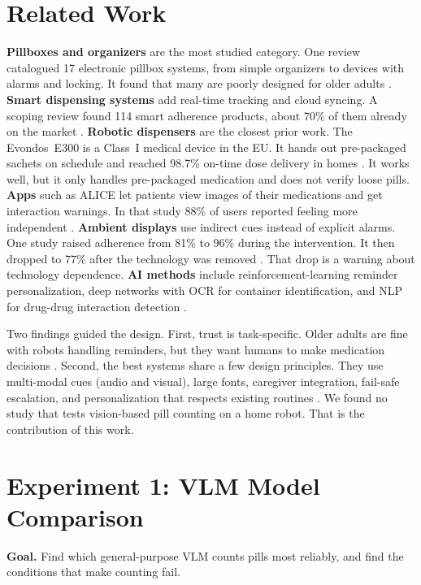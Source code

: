 \documentclass[10pt,twocolumn]{article}
\begin{document}
\section{Related Work}\label{sec:related}
\textbf{Pillboxes and organizers} are the most studied category. One review
catalogued 17 electronic pillbox systems, from simple organizers to devices with
alarms and locking. It found that many are poorly designed for older adults
\cite{miguel2018}. \textbf{Smart dispensing systems} add real-time tracking and
cloud syncing. A scoping review found 114 smart adherence products, about 70\% of
them already on the market \cite{faisal2023}. \textbf{Robotic dispensers} are the
closest prior work. The Evondos~E300 is a Class~I medical device in the EU. It hands
out pre-packaged sachets on schedule and reached 98.7\% on-time dose delivery in
homes \cite{rantanen2017}. It works well, but it only handles pre-packaged
medication and does not verify loose pills. \textbf{Apps} such as ALICE let patients
view images of their medications and get interaction warnings. In that study 88\% of
users reported feeling more independent \cite{consort2014}. \textbf{Ambient
displays} use indirect cues instead of explicit alarms. One study raised adherence
from 81\% to 96\% during the intervention. It then dropped to 77\% after the
technology was removed \cite{zarate2019}. That drop is a warning about technology
dependence. \textbf{AI methods} include reinforcement-learning reminder
personalization, deep networks with OCR for container identification, and NLP for
drug-drug interaction detection \cite{ciampi2022}.

Two findings guided the design. First, trust is task-specific. Older adults are fine
with robots handling reminders, but they want humans to make medication decisions
\cite{prakash2013}. Second, the best systems share a few design principles. They use
multi-modal cues (audio and visual), large fonts, caregiver integration, fail-safe
escalation, and personalization that respects existing routines
\cite{rantanen2017,miguel2018,palen2006}. We found no study that tests vision-based
pill counting on a home robot. That is the contribution of this work.

\section{Experiment 1: VLM Model Comparison}\label{sec:exp1}
\textbf{Goal.} Find which general-purpose VLM counts pills most reliably, and find
the conditions that make counting fail.
\end{document}
